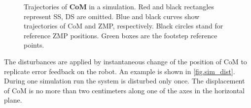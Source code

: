 \begin{figure}[!ht]
    \centering
\caption[Trajectories of {\bf CoM} in a simulation]{Trajectories of {\bf CoM} in a 
simulation. Red and black rectangles represent \ac{SS}, \ac{DS} are omitted. Blue 
and black curves show trajectories of \ac{CoM} and \ac{ZMP}, respectively. Black 
circles stand for reference \ac{ZMP} positions. Green boxes are the footstep 
reference points.}
\label{fig.sim_nodist}
\end{figure}

The disturbances are applied by instantaneous change of the position of \ac{CoM} 
to replicate error feedback on the robot. An example is shown in \cref{fig.sim_dist}. 
During one simulation run the system is disturbed only once. The displacement of
\ac{CoM} is no more than two centimeters along one of the axes in the horizontal
plane. 

